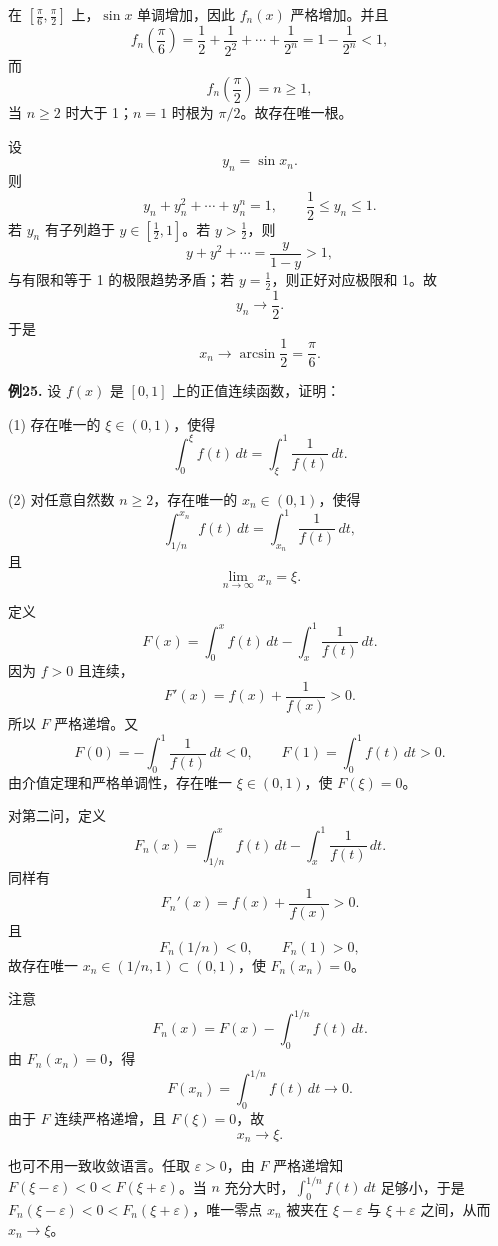 \begin{solutionblock}

在 \(\left[\frac\pi6,\frac\pi2\right]\) 上，\(\sin x\) 单调增加，因此 \(f_n(x)\) 严格增加。并且
\[
f_n\left(\frac\pi6\right)
=\frac12+\frac1{2^2}+\cdots+\frac1{2^n}
=1-\frac1{2^n}<1,
\]
而
\[
f_n\left(\frac\pi2\right)=n\ge1,
\]
当 \(n\ge2\) 时大于 1；\(n=1\) 时根为 \(\pi/2\)。故存在唯一根。

设
\[
y_n=\sin x_n.
\]
则
\[
y_n+y_n^2+\cdots+y_n^n=1,\qquad \frac12\le y_n\le1.
\]
若 \(y_n\) 有子列趋于 \(y\in[\frac12,1]\)。若 \(y>\frac12\)，则
\[
y+y^2+\cdots
=\frac{y}{1-y}>1,
\]
与有限和等于 1 的极限趋势矛盾；若 \(y=\frac12\)，则正好对应极限和 1。故
\[
y_n\to\frac12.
\]
于是
\[
x_n\to\arcsin\frac12=\frac\pi6.
\]

\end{solutionblock}

\begin{problemblock}
\textbf{例25.} 设 \(f(x)\) 是 \([0,1]\) 上的正值连续函数，证明：

(1) 存在唯一的 \(\xi\in(0,1)\)，使得
\[
\int_0^\xi f(t)\,dt=\int_\xi^1\frac1{f(t)}\,dt.
\]

(2) 对任意自然数 \(n\ge2\)，存在唯一的 \(x_n\in(0,1)\)，使得
\[
\int_{1/n}^{x_n} f(t)\,dt=\int_{x_n}^1\frac1{f(t)}\,dt,
\]
且
\[
\lim_{n\to\infty}x_n=\xi.
\]
\end{problemblock}

\begin{solutionblock}

定义
\[
F(x)=\int_0^x f(t)\,dt-\int_x^1\frac1{f(t)}\,dt.
\]
因为 \(f>0\) 且连续，
\[
F'(x)=f(x)+\frac1{f(x)}>0.
\]
所以 \(F\) 严格递增。又
\[
F(0)=-\int_0^1\frac1{f(t)}\,dt<0,\qquad
F(1)=\int_0^1f(t)\,dt>0.
\]
由介值定理和严格单调性，存在唯一 \(\xi\in(0,1)\)，使 \(F(\xi)=0\)。

对第二问，定义
\[
F_n(x)=\int_{1/n}^x f(t)\,dt-\int_x^1\frac1{f(t)}\,dt.
\]
同样有
\[
F_n'(x)=f(x)+\frac1{f(x)}>0.
\]
且
\[
F_n(1/n)<0,\qquad F_n(1)>0,
\]
故存在唯一 \(x_n\in(1/n,1)\subset(0,1)\)，使 \(F_n(x_n)=0\)。

注意
\[
F_n(x)=F(x)-\int_0^{1/n}f(t)\,dt.
\]
由 \(F_n(x_n)=0\)，得
\[
F(x_n)=\int_0^{1/n}f(t)\,dt\to0.
\]
由于 \(F\) 连续严格递增，且 \(F(\xi)=0\)，故
\[
x_n\to\xi.
\]

也可不用一致收敛语言。任取 \(\varepsilon>0\)，由 \(F\) 严格递增知 \(F(\xi-\varepsilon)<0<F(\xi+\varepsilon)\)。当 \(n\) 充分大时，\(\int_0^{1/n}f(t)\,dt\) 足够小，于是 \(F_n(\xi-\varepsilon)<0<F_n(\xi+\varepsilon)\)，唯一零点 \(x_n\) 被夹在 \(\xi-\varepsilon\) 与 \(\xi+\varepsilon\) 之间，从而 \(x_n\to\xi\)。
\end{solutionblock}

